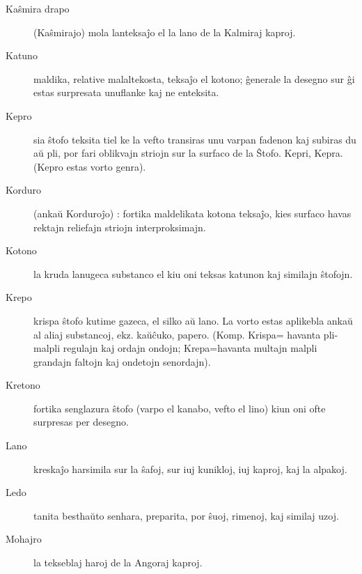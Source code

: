 \begin{description}
\item[Kaŝmira drapo]

 (Kaŝmirajo) mola lanteksaĵo el la lano de la Kalmiraj kaproj.

\item[Katuno]

 maldika, relative malaltekosta, teksaĵo el kotono; ĝenerale la desegno sur ĝi estas surpresata unuflanke kaj ne enteksita.

\item[Kepro]

 sia ŝtofo teksita tiel ke la vefto transiras unu varpan fadenon kaj subiras du aŭ pli, por fari oblikvajn striojn sur la surfaco de la Ŝtofo. Kepri, Kepra. (Kepro estas vorto genra).

\item[\dagger\space Korduro]

 (ankaŭ Korduroĵo) : fortika maldelikata kotona teksaĵo, kies surfaco havas rektajn reliefajn striojn interproksimajn.

\item[Kotono]

 la kruda lanugeca substanco el kiu oni teksas katunon kaj similajn ŝtofojn.

\item[Krepo]

 krispa ŝtofo kutime gazeca, el silko aŭ lano. La vorto estas aplikebla ankaŭ al aliaj substancoj, ekz. kaŭĉuko, papero. (Komp. Krispa= havanta pli-malpli regulajn kaj ordajn ondojn; Krepa=havanta multajn malpli grandajn faltojn kaj ondetojn senordajn).

\item[Kretono]

 fortika senglazura ŝtofo (varpo el kanabo, vefto el lino) kiun oni ofte surpresas per desegno.

\item[Lano]

 kreskaĵo harsimila sur la ŝafoj, sur iuj kunikloj, iuj kaproj, kaj la alpakoj.

\item[Ledo]

 tanita besthaŭto senhara, preparita, por ŝuoj, rimenoj, kaj similaj uzoj.

\item[\dagger\space Mohajro]

 la tekseblaj haroj de la Angoraj kaproj.


\end{description}
